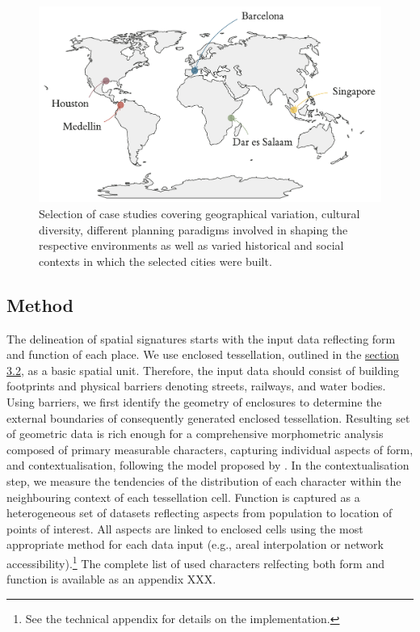 \begin{figure}
    \includegraphics[width=0.75\linewidth, center]{figures/examples_map.pdf}
    \caption{Selection of case studies covering geographical variation,
    cultural diversity, different planning paradigms involved in shaping the
    respective environments as well as varied historical and social contexts in which the
    selected cities were built.}
    \label{fig:world_map}
\end{figure}

\subsection{Method}



The delineation of spatial signatures starts with the input data reflecting form and
function of each place. We use enclosed tessellation, outlined in the
\hyperref[sec:ssec:ss_et]{section 3.2}, as a basic spatial unit. Therefore, the input
data should consist of building footprints and physical barriers denoting streets,
railways, and water bodies.
Using barriers, we first identify the geometry of enclosures to determine the external
boundaries of consequently generated enclosed tessellation.
Resulting set of geometric data is rich enough for a comprehensive morphometric analysis
composed of primary measurable characters, capturing individual aspects of form, and
contextualisation, following the model proposed by
\citealp{fleischmann2021methodological}. In the contextualisation step, we measure the
tendencies of the distribution of each character within the neighbouring context of each
tessellation cell.
Function is captured as a heterogeneous set of datasets reflecting aspects from
population to location of points of interest. All aspects are linked to enclosed cells
using the most appropriate method for each data input (e.g., areal interpolation or
network accessibility).\footnote{See the technical appendix for details on the
implementation.} The complete list of used characters relfecting both form and function
is available as an appendix XXX.

